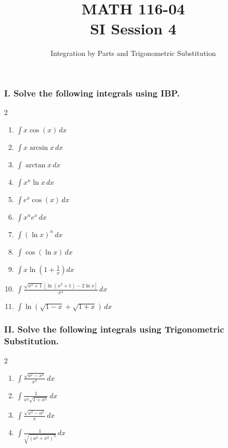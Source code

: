 \documentclass[12pt]{article}
\begin{document}

\title{MATH 116-04 \\ SI Session 4}
\author{ Integration by Parts and Trigonometric Substitution}

\maketitle

\subsubsection*{I. Solve the following integrals using IBP.}

\begin{multicols}{2}
\begin{enumerate}
    \item $\displaystyle \int x\cos(x) \, dx$
    \item $\displaystyle \int x\arcsin{x} \, dx$
    \item $\displaystyle \int \arctan{x} \, dx$
    \item $\displaystyle \int x^n\ln{x} \, dx$
    \item $\displaystyle \int e^x\cos(x) \, dx$
    \item $\displaystyle \int x^n e^{x} \, dx$
    \item $\displaystyle \int (\ln{x})^n \, dx$
    \item $\displaystyle \int \cos{(\ln{x})} \, dx$
    \item $\displaystyle \int x\ln\left(1+\frac{1}{x}\right) dx$
    \item $\displaystyle \int \frac{\sqrt{x^2+1}  [\ln{(x^2+1)}-2\ln x]}{x^4} \, dx$
    \item $\displaystyle \int \ln{(\sqrt{1-x}+\sqrt{1+x})} \, dx$


\end{enumerate}
\end{multicols}
\subsubsection*{II. Solve the following integrals using Trigonometric Substitution.}

\begin{multicols}{2}
\begin{enumerate}
    \item $\displaystyle \int \frac{\sqrt{a^2-x^2}}{x^2} \, dx$
    \item $\displaystyle \int \frac{1}{x^2\sqrt{1+x^2}} \, dx$
    \item $\displaystyle \int \frac{\sqrt{x^2-a^2}}{x} \, dx$
    \item $\displaystyle \int \frac{1}{\sqrt{(a^2+x^2)^3}} \, dx$


\end{enumerate}
\end{multicols}
\end{document}
